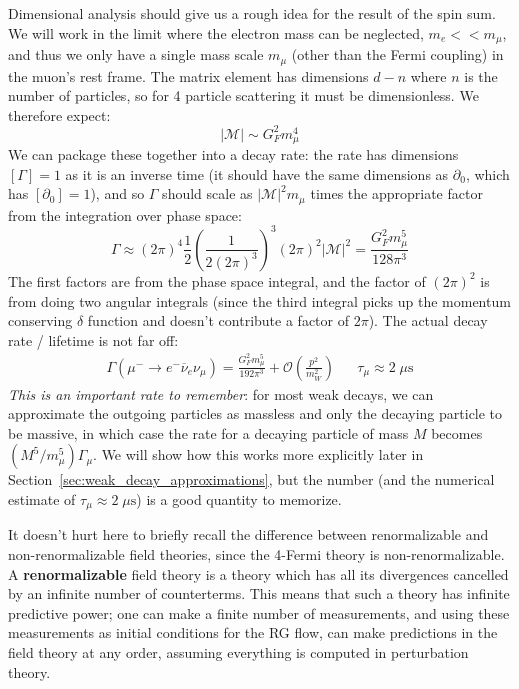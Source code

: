 \documentclass[11pt, oneside]{article}   	%
\theoremstyle{definition}
\numberwithin{equation}{subsection}		%
\begin{document}
Dimensional analysis should give us a rough idea for the result of the spin sum. We will work in the limit where the electron mass can 
be neglected, $m_e << m_\mu$, and thus we only have a single mass scale $m_\mu$ (other than the Fermi coupling) in the muon's rest 
frame. The matrix element has dimensions $d - n$ where $n$ is the number of particles, so for 4 particle scattering it must be dimensionless. 
We therefore expect:
\begin{equation}
	|\mathcal M|\sim G_F^2 m_\mu^4
\end{equation}
We can package these together into a decay rate: the rate has dimensions $[\Gamma] = 1$ as it is an inverse time (it should have the same 
dimensions as $\partial_0$, which has $[\partial_0] = 1$), and so $\Gamma$ should scale as $|\mathcal M|^2 m_\mu$ times the 
appropriate factor from the integration over phase space:
\begin{equation}
	\Gamma\approx (2\pi)^4\frac{1}{2}\left(\frac{1}{2(2\pi)^3}\right)^3 (2\pi)^2 |\mathcal M|^2 = \frac{G_F^2 m_\mu^5}{128\pi^3}
\end{equation}
The first factors are from the phase space integral, and the factor of $(2\pi)^2$ is from doing two angular integrals (since the third integral picks up the 
momentum conserving $\delta$ function and doesn't contribute a factor of $2\pi$). The actual decay rate / lifetime is not far off:
\begin{align}
	\Gamma(\mu^-\rightarrow e^- \overline\nu_e \nu_\mu) = \frac{G_F^2 m_\mu^5}{192\pi^3} + \mathcal O\left(\frac{p^2}{m_W^2}\right) && \tau_\mu \approx 2\;\mu\mathrm{s}
\end{align}
\textit{This is an important rate to remember}: for most weak decays, we can approximate the outgoing particles as massless and only the decaying 
particle to be massive, in which case the rate for a decaying particle of mass $M$ becomes $(M^5 / m_\mu^5) \Gamma_\mu$. We will show how this 
works more explicitly later in Section~\ref{sec:weak_decay_approximations}, but the number (and the numerical estimate of $\tau_\mu\approx 2\;\mu\mathrm{s}$)
is a good quantity to memorize. 

It doesn't hurt here to briefly recall the difference between renormalizable and non-renormalizable field theories, since the 4-Fermi 
theory is non-renormalizable. A \textbf{renormalizable} field theory is a theory which has all its divergences cancelled by an infinite 
number of counterterms. This means that such a theory has infinite predictive power; one can make a finite number of measurements, 
and using these measurements as initial conditions for the RG flow, can make predictions in the field theory at any order, assuming everything 
is computed in perturbation theory. 
\end{document}
